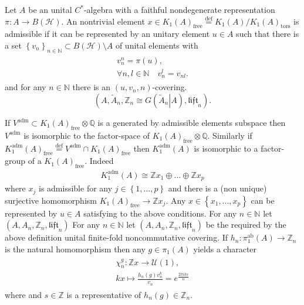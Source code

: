 \documentclass{beamer}
\theoremstyle{plain}
\newcommand{\Z}{\mathbb{Z}}                  %
\newcommand{\Q}{\mathbb{Q}}                  %
\newcommand{\lift}{\mathfrak{lift}}
\newcommand{\sU}{\mathcal{U}}       %
\newcommand{\N}{\mathbb{N}}                  %
\renewcommand{\H}{\mathcal{H}}               %
\newcommand{\bean}{\begin{eqnarray*}}
\newcommand{\eean}{\end{eqnarray*}}
\newcommand{\bydef}{\stackrel{\mathrm{def}}{=}}
\begin{document}
\begin{frame}
	\begin{definition}
		Let $A$ be an unital $C^*$-algebra with a faithful nondegenerate representation $\pi: A \to B\left(\H \right)$. 
		An nontrivial element $x \in K_1\left( A\right)_{\mathrm{free}}\bydef K_1\left( A\right)/K_1\left( A\right)_{\mathrm{tors}}$ is \alert{admissible} if it can be represented by an unitary element $u \in  A$  such that there is a set $\left\{v_{n}\right\}_{n \in \N}\subset B\left(\H \right)\setminus A$ of unital elements with
		\bean
		\begin{split}
			v_n^n=\pi\left(u\right),\\
			\forall n, l \in \N \quad v_{n}^l = v_{nl}. 
		\end{split}
		\eean
		and for any $n \in \N$ there is an $\left( u, v_n, n\right)$-covering.
		$$
		\left(   A , \widetilde A_n, \Z_n\cong G\left( \left.\widetilde A_n\right| A\right) ,  \lift_n \right).
		$$
	\end{definition}

\end{frame}
\begin{frame}
	If $V^{\mathrm{adm}}\subset K_1\left( A\right)_{\mathrm{free}}\otimes \Q$ is a generated by admissible elements subspace then $V^{\mathrm{adm}}$ is isomorphic to  the factor-space of   $K_1\left( A\right)_{\mathrm{free}}\otimes \Q$. Similarly if $K^{\mathrm{adm}}_1\left( A\right)_{\mathrm{free}}\bydef V^{\mathrm{adm}} \cap  K_1\left( A\right)_{\mathrm{free}}$ then $K^{\mathrm{adm}}_1\left( A\right)$ is isomorphic to  a factor-group of a $K_1\left( A\right)_{\mathrm{free}}$. Indeed
\bean
K^{\mathrm{adm}}_1\left( A\right)\cong \Z x_1 \oplus ...\oplus \Z x_p
\eean
where $x_j$ is admissible for any $j \in \left\{1,...,p\right\}$ and there is a (non unique) surjective homomorphism $K_1\left( A\right)_{\mathrm{free}}\to \Z x_j$. Any $x \in \left\{x_1,...,  x_p\right\}$  can be represented by $u \in  A$ satisfying to the above conditions. For any $n \in \N$ let $
\left(A, A_n, \Z_n, \lift_n \right) 
$
For any $n \in \N$ let $
\left(A, A_n, \Z_n, \lift_n \right) 
$
be the required by the above definition unital finite-fold  noncommutative covering.  If $h_{n} : \pi^{\mathrm{ab}}_1\left(A\right)\to \Z_n$ is the natural homomorphism then   any $g \in \pi_1\left(A\right)$ yields a character
\bean
\begin{split}
	\chi^g_n : \Z  x \to \sU\left( 1\right),\\
	k   x \mapsto \frac{h_n\left( g\right) v^k_n}{v_n}= e^{\frac{2\pi i ks}{n}} 
\end{split}
\eean
where  and    $s \in \Z$ is a representative of $h_n\left( g\right)\in \Z_n$. 
\end{frame}
\end{document}
